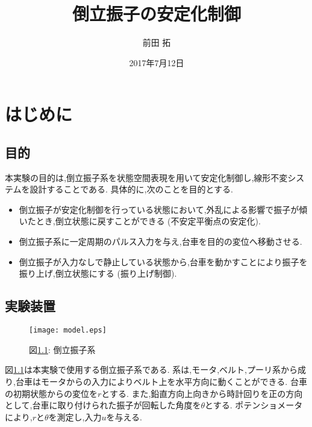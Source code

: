 \documentclass[a4j,11pt,twoside]{jbook}
\begin{document}
\title{倒立振子の安定化制御}
\author{前田 拓}
\date{2017年7月12日}
\maketitle

\tableofcontents
\listoffigures
\listoftables
{}


\chapter{はじめに}
\section{目的}
本実験の目的は,倒立振子系を状態空間表現を用いて安定化制御し,線形不変システムを設計することである.
具体的に,次のことを目的とする.

\begin{itemize}
    \renewcommand{\labelenumi}{(\roman{enumi})}
    \item 倒立振子が安定化制御を行っている状態において,外乱による影響で振子が傾いたとき,倒立状態に戻すことができる (不安定平衡点の安定化).
    \item 倒立振子系に一定周期のパルス入力を与え,台車を目的の変位へ移動させる.
    \item 倒立振子が入力なしで静止している状態から,台車を動かすことにより振子を振り上げ,倒立状態にする (振り上げ制御).
\end{itemize}

\section{実験装置}

\begin{figure}[htbp]
    \begin{center}
        \texttt{[image: model.eps]}
        \caption{図\ref{pendulum}: 倒立振子系}
        \label{pendulum}
    \end{center}
\end{figure}

図\ref{pendulum}は本実験で使用する倒立振子系である.
系は,モータ,ベルト,プーリ系から成り,台車はモータからの入力によりベルト上を水平方向に動くことができる.
台車の初期状態からの変位を$r$とする.
また,鉛直方向上向きから時計回りを正の方向として,台車に取り付けられた振子が回転した角度を$\theta$とする.
ポテンショメータにより,$r$と$\theta$を測定し,入力$u$を与える.
\end{document}

